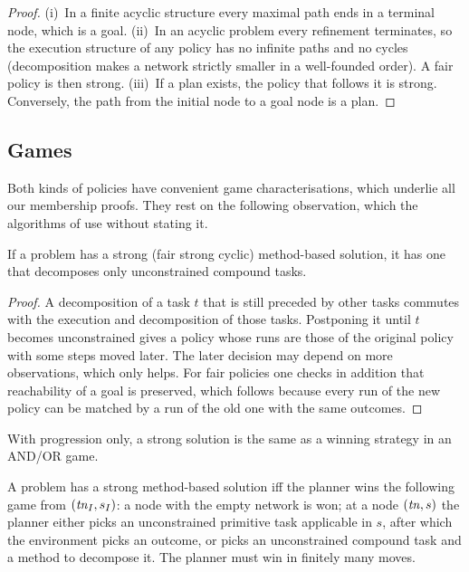 \begin{proof}
  (i)~In a finite acyclic structure every maximal path ends in a terminal node, which is a goal.
  (ii)~In an acyclic problem every refinement terminates, so the execution structure of any
  policy has no infinite paths and no cycles (decomposition makes a network strictly smaller in
  a well-founded order). A fair policy is then strong.
  (iii)~If a plan exists, the policy that follows it is strong. Conversely, the path from the
  initial node to a goal node is a plan.
\end{proof}

\subsection{Games}\label{sec:games}

Both kinds of policies have convenient game characterisations, which underlie all our membership
proofs. They rest on the following observation, which the algorithms of \CBb{} use without
stating it.

\begin{lemma}\label{lem:delay}
  If a problem has a strong (fair strong cyclic) method-based solution, it has one that
  decomposes only unconstrained compound tasks.
\end{lemma}

\begin{proof}
  A decomposition of a task $t$ that is still preceded by other tasks commutes with the
  execution and decomposition of those tasks. Postponing it until $t$ becomes unconstrained gives
  a policy whose runs are those of the original policy with some steps moved later. The later
  decision may depend on more observations, which only helps. For fair policies one checks in
  addition that reachability of a goal is preserved, which follows because every run of the new
  policy can be matched by a run of the old one with the same outcomes.
\end{proof}

With progression only, a strong solution is the same as a winning strategy in an AND/OR game.

\begin{theorem}\label{thm:mp-andor}
  A problem has a strong method-based solution iff the planner wins the following game from
  $(\mathit{tn}_I,s_I)$: a node with the empty network is won; at a node $(\mathit{tn},s)$ the planner either picks
  an unconstrained primitive task applicable in $s$, after which the environment picks an
  outcome, or picks an unconstrained compound task and a method to decompose it.
  The planner must win in finitely many moves.
\end{theorem}

